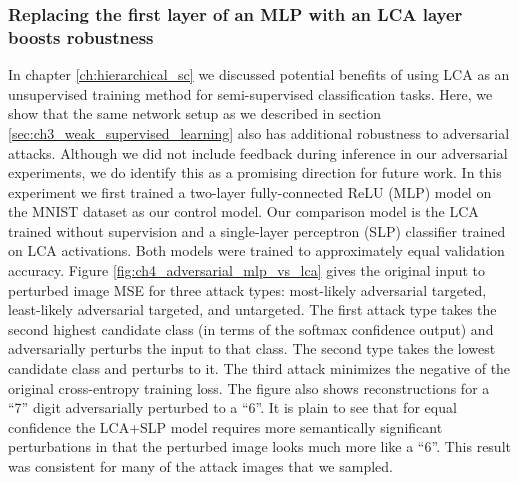 \subsubsection{Replacing the first layer of an MLP with an LCA layer boosts robustness}
In chapter \ref{ch:hierarchical_sc} we discussed potential benefits of using LCA as an unsupervised training method for semi-supervised classification tasks. Here, we show that the same network setup as we described in section \ref{sec:ch3_weak_supervised_learning} also has additional robustness to adversarial attacks. Although we did not include feedback during inference in our adversarial experiments, we do identify this as a promising direction for future work. In this experiment we first trained a two-layer fully-connected ReLU (MLP) model on the MNIST dataset as our control model. Our comparison model is the LCA trained without supervision and a single-layer perceptron (SLP) classifier trained on LCA activations. Both models were trained to approximately equal validation accuracy. Figure \ref{fig:ch4_adversarial_mlp_vs_lca} gives the original input to perturbed image MSE for three attack types: most-likely adversarial targeted, least-likely adversarial targeted, and untargeted. The first attack type takes the second highest candidate class (in terms of the softmax confidence output) and adversarially perturbs the input to that class. The second type takes the lowest candidate class and perturbs to it. The third attack minimizes the negative of the original cross-entropy training loss. The figure also shows reconstructions for a ``7'' digit adversarially perturbed to a ``6''. It is plain to see that for equal confidence the LCA+SLP model requires more semantically significant perturbations in that the perturbed image looks much more like a ``6''. This result was consistent for many of the attack images that we sampled.

